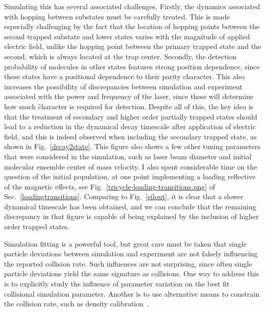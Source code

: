 Simulating this has several associated challenges.
Firstly, the dynamics associated with hopping between substates must be carefully treated.
This is made especially challenging by the fact that the location of hopping points between the second trapped substate and lower states varies with the magnitude of applied electric field, unlike the hopping point between the primary trapped state and the second, which is always located at the trap center.
Secondly, the detection probability of molecules in other states features strong position dependence, since these states have a positional dependence to their parity character.
This also increases the possibility of discrepancies between simulation and experiment associated with the power and frequency of the laser, since these will determine how much \f character is required for detection.
Despite all of this, the key idea is that the treatment of secondary and higher order partially trapped states should lead to a reduction in the dynamical decay timescale after application of electric field, and this is indeed observed when including the secondary trapped state, as shown in Fig.~\ref{decay2state}.
This figure also shows a few other tuning parameters that were considered in the simulation, such as laser beam diameter and initial molecular ensemble center of mass velocity.
I also spent considerable time on the question of the initial population, at one point implementing a loading reflective of the  magnetic effects, see Fig.~\ref{tricycle-loading-transitions.png} of Sec.~\ref{loadingtransitions}.
Comparing to Fig.~\ref{eilout}, it is clear that a slower dynamical timescale has been obtained, and we can conclude that the remaining discrepancy in that figure is capable of being explained by the inclusion of higher order trapped states.

Simulation fitting is a powerful tool, but great care must be taken that single particle deviations between simulation and experiment are not falsely influencing the reported collision rate.
Such influences are not surprising, since often single particle deviations yield the same signature as collisions.
One way to address this is to explicitly study the influence of parameter variation on the best fit collisional simulation parameter.
Another is to use alternative means to constrain the collision rate, such as density calibration~\citep[Chapter~4]{WuThesis2019}. 

